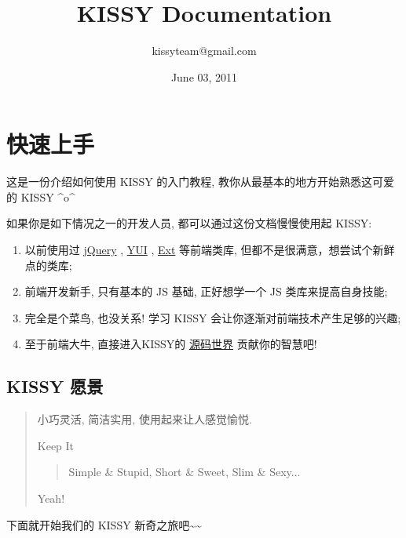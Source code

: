 \documentclass[letterpaper,10pt,english]{sphinxmanual}
\title{KISSY Documentation}
\date{June 03, 2011}
\author{kissyteam@gmail.com}
\begin{document}
\maketitle
\tableofcontents
{}\label{index::doc}



\chapter{快速上手}
\label{quickstart/index:index}\label{quickstart/index::doc}\label{quickstart/index:quickstart}\label{quickstart/index:id1}
这是一份介绍如何使用 KISSY 的入门教程, 教你从最基本的地方开始熟悉这可爱的 KISSY \textasciicircum{}o\textasciicircum{}

如果你是如下情况之一的开发人员, 都可以通过这份文档慢慢使用起 KISSY:
\begin{enumerate}
\item {}
以前使用过 \href{http://jquery.com/}{jQuery} , \href{http://developer.yahoo.com/yui/}{YUI} , \href{http://www.sencha.com/products/js/}{Ext} 等前端类库, 但都不是很满意，想尝试个新鲜点的类库;

\item {}
前端开发新手, 只有基本的 JS 基础, 正好想学一个 JS 类库来提高自身技能;

\item {}
完全是个菜鸟, 也没关系! 学习 KISSY 会让你逐渐对前端技术产生足够的兴趣;

\item {}
至于前端大牛, 直接进入KISSY的 \href{http://github.com/kissyteam/kissy/tree/master/src/}{源码世界} 贡献你的智慧吧!

\end{enumerate}


\section{KISSY 愿景}
\label{quickstart/index:kissy}\begin{quote}

小巧灵活, 简洁实用, 使用起来让人感觉愉悦.

Keep It
\begin{quote}

Simple \& Stupid, Short \& Sweet, Slim \& Sexy...
\end{quote}

Yeah!
\end{quote}

下面就开始我们的 KISSY 新奇之旅吧\textasciitilde{}\textasciitilde{}
\end{document}

